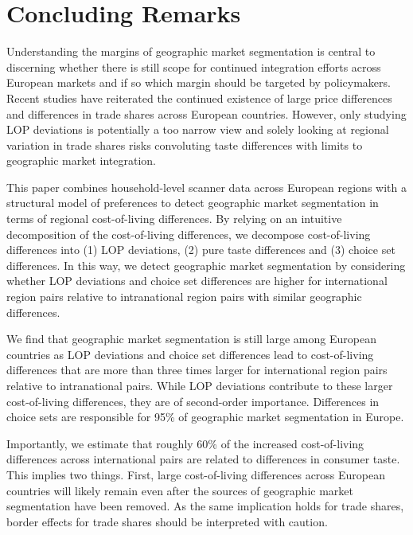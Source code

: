 \section{Concluding Remarks}\label{sec:conclusion}
Understanding the margins of geographic market segmentation is central to discerning whether there is still scope for continued integration efforts across European markets and if so which margin should be targeted by policymakers. Recent studies have reiterated the continued existence of large price differences and differences in trade shares across European countries. However, only studying LOP deviations is potentially a too narrow view and solely looking at regional variation in trade shares risks convoluting taste differences with limits to geographic market integration. 

This paper combines household-level scanner data across European regions with a structural model of preferences to detect geographic market segmentation in terms of regional cost-of-living differences. By relying on an intuitive decomposition of the cost-of-living differences, we decompose cost-of-living differences into (1) LOP deviations, (2) pure taste differences and (3) choice set differences. In this way, we detect geographic market segmentation by considering whether LOP deviations and choice set differences are higher for international region pairs relative to intranational region pairs with similar geographic differences.

We find that geographic market segmentation is still large among European countries as LOP deviations and choice set differences lead to cost-of-living differences that are more than three times larger for international region pairs relative to intranational pairs. While LOP deviations contribute to these larger cost-of-living differences, they are of second-order importance. Differences in choice sets are responsible for 95\% of geographic market segmentation in Europe. 

Importantly, we estimate that roughly 60\% of the increased cost-of-living differences across international pairs are related to differences in consumer taste. This implies two things. First, large cost-of-living differences across European countries will likely remain even after the sources of geographic market segmentation have been removed. As the same implication holds for trade shares, border effects for trade shares should be interpreted with caution. 

